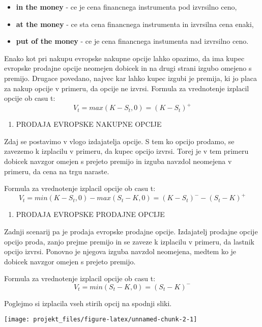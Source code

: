 \documentclass[
]{article}
\providecommand{\tightlist}{%
  \setlength{\itemsep}{0pt}\setlength{\parskip}{0pt}}
\begin{document}
\begin{itemize}
\tightlist
\item
  \textbf{in the money} - ce je cena financnega instrumenta pod
  izvrsilno ceno,
\item
  \textbf{at the money} - ce sta cena financnega instrumenta in
  izvrsilna cena enaki,
\item
  \textbf{put of the money} - ce je cena financnega instumenta nad
  izvrsilno ceno.
\end{itemize}

Enako kot pri nakupu evropske nakupne opcije lahko opazimo, da ima kupec
evropske prodajne opcije neomejen dobicek in na drugi strani izgubo
omejeno s premijo. Drugace povedano, najvec kar lahko kupec izgubi je
premija, ki jo placa za nakup opcije v primeru, da opcije ne izvrsi.
Formula za vrednotenje izplacil opcije ob casu t:
\[ V_t = max(K-S_t,0) = (K-S_t)^+ \]

\begin{enumerate}
\def\labelenumi{\arabic{enumi}.}
\setcounter{enumi}{2}
\tightlist
\item
  PRODAJA EVROPSKE NAKUPNE OPCIJE
\end{enumerate}

Zdaj se postavimo v vlogo izdajatelja opcije. S tem ko opcijo prodamo,
se zavezemo k izplacilu v primeru, da kupec opcijo izvrsi. Torej je v
tem primeru dobicek navzgor omejen s prejeto premijo in izguba navzdol
neomejena v primeru, da cena na trgu naraste.

Formula za vrednotenje izplacil opcije ob casu t:
\[ V_t = min(K-S_t,0) - max(S_t-K,0) = (K-S_t)^- - (S_t - K)^+ \]

\begin{enumerate}
\def\labelenumi{\arabic{enumi}.}
\setcounter{enumi}{3}
\tightlist
\item
  PRODAJA EVROPSKE PRODAJNE OPCIJE
\end{enumerate}

Zadnji scenarij pa je prodaja evropske prodajne opcije. Izdajatelj
prodajne opcije opcijo proda, zanjo prejme premijo in se zaveze k
izplacilu v primeru, da lastnik opcijo izvrsi. Ponovno je njegova izguba
navzdol neomejena, medtem ko je dobicek navzgor omejen s prejeto
premijo.

Formula za vrednotenje izplacil opcije ob casu t:
\[ V_t = min(S_t-K,0) = (S_t-K)^-  \]

Poglejmo si izplacila vseh stirih opcij na spodnji sliki.

\begin{center}\texttt{[image: projekt\_files/figure-latex/unnamed-chunk-2-1]} \end{center}
\end{document}
